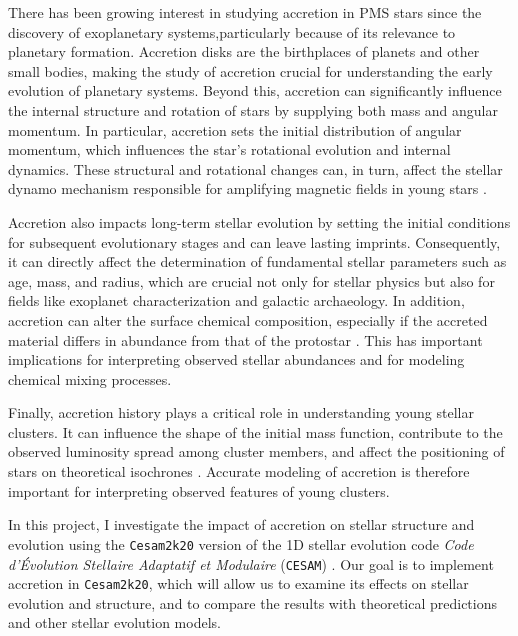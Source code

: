 \documentclass[12pt,a4paper]{article}
\begin{document}
There has been growing interest in studying accretion in PMS stars since the discovery of exoplanetary systems,particularly because of its relevance to planetary formation. Accretion disks are the birthplaces of planets and other small bodies, making the study of accretion crucial for understanding the early evolution of planetary systems. Beyond this, accretion can significantly influence the internal structure and rotation of stars by supplying both mass and angular momentum. In particular, accretion sets the initial distribution of angular momentum, which influences the star's rotational evolution and internal dynamics. These structural and rotational changes can, in turn, affect the stellar dynamo mechanism responsible for amplifying magnetic fields in young stars \parencite[e.g.,][]{StelzerNeuhauser2001}. 

Accretion also impacts long-term stellar evolution by setting the initial conditions for subsequent evolutionary stages and can leave lasting imprints. Consequently, it can directly affect the determination of fundamental stellar parameters such as age, mass, and radius, which are crucial not only for stellar physics but also for fields like exoplanet characterization and galactic archaeology. In addition, accretion can alter the surface chemical composition, especially if the accreted material differs in abundance from that of the protostar \parencite{KunitomoGuillot2021}. This has important implications for interpreting observed stellar abundances and for modeling chemical mixing processes.

Finally, accretion history plays a critical role in understanding young stellar clusters. It can influence the shape of the initial mass function, contribute to the observed luminosity spread among cluster members, and affect the positioning of stars on theoretical isochrones \parencite{BaraffeEtAl2009,BaraffeEtAl2012,HosokawaEtAl2011}. Accurate modeling of accretion is therefore important for interpreting observed features of young clusters.

In this project, I investigate the impact of accretion on stellar structure and evolution using the \texttt{Cesam2k20} version of the 1D stellar evolution code \textit{Code d'Évolution Stellaire Adaptatif et Modulaire} (\texttt{CESAM}) \parencite{Morel1997,MorelLebreton2008,MarquesEtAl2013}. Our goal is to implement accretion in \texttt{Cesam2k20}, which will allow us to examine its effects on stellar evolution and structure, and to compare the results with theoretical predictions and other stellar evolution models.
\end{document}
